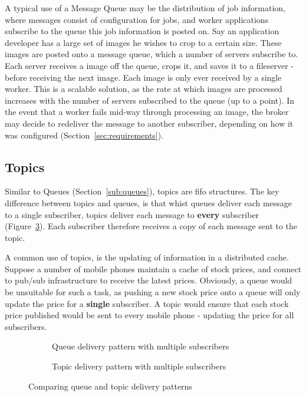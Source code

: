 A typical use of a Message Queue may be the distribution of job information,
where messages consist of configuration for jobs, and worker applications
subscribe to the queue this job information is posted on. Say an application
developer has a large set of images he wishes to crop to a certain size. These
images are posted onto a message queue, which a number of servers subscribe to.
Each server receives a image off the queue, crops it, and saves it to a
fileserver - before receiving the next image. Each image is only ever received
by a single worker. This is a scalable solution, as the rate at which images are
processed increases with the number of servers subscribed to the queue (up to a
point). In the event that a worker fails mid-way through processing an image,
the broker may decide to redeliver the message to another subscriber, depending
on how it was configured (Section~\ref{sec:requirements}).

\subsection{Topics}
\label{sub:topics}

Similar to Queues (Section~\ref{sub:queues}), topics are \gls{fifo} structures.
The key difference between topics and queues, is that whist queues deliver each
message to a single subscriber, topics deliver each message to \textbf{every}
subscriber (Figure~\ref{fig:tikz:queueVsTopic}). Each subscriber therefore
receives a copy of each message sent to the topic.

A common use of topics, is the updating of information in a distributed cache.
Suppose a number of mobile phones maintain a cache of stock prices, and
connect to pub/sub infrastructure to receive the latest prices. Obviously, a
queue would be unsuitable for such a task, as pushing a new stock price onto a
queue will only update the price for a \textbf{single} subscriber. A topic
would ensure that each stock price published would be sent to every mobile phone -
updating the price for all subscribers.

\begin{figure}[htbp]
  \centering
  \begin{subfigure}[t]{0.5\textwidth}
    \centering
    
    \caption{Queue delivery pattern with multiple subscribers}
    \label{fig:tikz:messageBrokerQueue}
  \end{subfigure}

  \begin{subfigure}[t]{0.5\textwidth}
    \centering
    
    \caption{Topic delivery pattern with multiple subscribers}
    \label{fig:tikz:messageBrokerTopic}
  \end{subfigure}
  \caption{Comparing queue and topic delivery patterns}
  \label{fig:tikz:queueVsTopic}
\end{figure}


